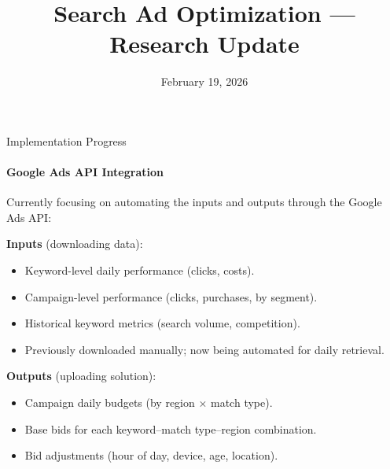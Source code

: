 \documentclass[smaller]{beamer}
\title{Search Ad Optimization --- Research Update}
\date{February 19, 2026}
\begin{document}
\begin{frame}
\titlepage
\end{frame}

\begin{frame}{Implementation Progress}
\framesubtitle{Google Ads API Integration}

Currently focusing on automating the inputs and outputs through the Google Ads API:

\medskip
\textbf{Inputs} (downloading data):
\begin{itemize}
    \item Keyword-level daily performance (clicks, costs).
    \item Campaign-level performance (clicks, purchases, by segment).
    \item Historical keyword metrics (search volume, competition).
    \item Previously downloaded manually; now being automated for daily retrieval.
\end{itemize}

\medskip
\textbf{Outputs} (uploading solution):
\begin{itemize}
    \item Campaign daily budgets (by region $\times$ match type).
    \item Base bids for each keyword--match type--region combination.
    \item Bid adjustments (hour of day, device, age, location).
\end{itemize}

\end{frame}
\end{document}
